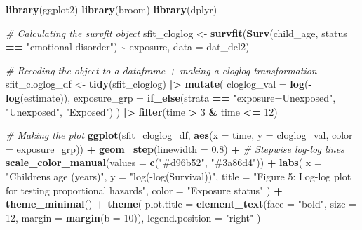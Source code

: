 \documentclass[
]{article}
\newenvironment{Shaded}{\begin{snugshade}}{\end{snugshade}}
\newcommand{\AttributeTok}[1]{\textcolor[rgb]{0.13,0.29,0.53}{#1}}
\newcommand{\CommentTok}[1]{\textcolor[rgb]{0.56,0.35,0.01}{\textit{#1}}}
\newcommand{\DecValTok}[1]{\textcolor[rgb]{0.00,0.00,0.81}{#1}}
\newcommand{\FloatTok}[1]{\textcolor[rgb]{0.00,0.00,0.81}{#1}}
\newcommand{\FunctionTok}[1]{\textcolor[rgb]{0.13,0.29,0.53}{\textbf{#1}}}
\newcommand{\NormalTok}[1]{#1}
\newcommand{\OtherTok}[1]{\textcolor[rgb]{0.56,0.35,0.01}{#1}}
\newcommand{\SpecialCharTok}[1]{\textcolor[rgb]{0.81,0.36,0.00}{\textbf{#1}}}
\newcommand{\StringTok}[1]{\textcolor[rgb]{0.31,0.60,0.02}{#1}}
\begin{document}
\begin{Shaded}
\begin{Highlighting}[]
\FunctionTok{library}\NormalTok{(ggplot2)}
\FunctionTok{library}\NormalTok{(broom)}
\FunctionTok{library}\NormalTok{(dplyr)}

\CommentTok{\# Calculating the survfit object}
\NormalTok{sfit\_cloglog }\OtherTok{\textless{}{-}} \FunctionTok{survfit}\NormalTok{(}\FunctionTok{Surv}\NormalTok{(child\_age, status }\SpecialCharTok{==} \StringTok{"emotional disorder"}\NormalTok{) }\SpecialCharTok{\textasciitilde{}}\NormalTok{ exposure,}
                        \AttributeTok{data =}\NormalTok{ dat\_del2)}

\CommentTok{\# Recoding the object to a dataframe + making a cloglog{-}transformation }
\NormalTok{sfit\_cloglog\_df }\OtherTok{\textless{}{-}} \FunctionTok{tidy}\NormalTok{(sfit\_cloglog) }\SpecialCharTok{|\textgreater{}} 
  \FunctionTok{mutate}\NormalTok{(}
    \AttributeTok{cloglog\_val =} \FunctionTok{log}\NormalTok{(}\SpecialCharTok{{-}}\FunctionTok{log}\NormalTok{(estimate)),}
    \AttributeTok{exposure\_grp =} \FunctionTok{if\_else}\NormalTok{(strata }\SpecialCharTok{==} \StringTok{"exposure=Unexposed"}\NormalTok{, }\StringTok{"Unexposed"}\NormalTok{, }\StringTok{"Exposed"}\NormalTok{)}
\NormalTok{  ) }\SpecialCharTok{|\textgreater{}} 
  \FunctionTok{filter}\NormalTok{(time }\SpecialCharTok{\textgreater{}} \DecValTok{3} \SpecialCharTok{\&}\NormalTok{ time }\SpecialCharTok{\textless{}=} \DecValTok{12}\NormalTok{)  }

\CommentTok{\# Making the plot }
\FunctionTok{ggplot}\NormalTok{(sfit\_cloglog\_df, }
       \FunctionTok{aes}\NormalTok{(}\AttributeTok{x =}\NormalTok{ time, }\AttributeTok{y =}\NormalTok{ cloglog\_val, }\AttributeTok{color =}\NormalTok{ exposure\_grp)) }\SpecialCharTok{+}
  \FunctionTok{geom\_step}\NormalTok{(}\AttributeTok{linewidth =} \FloatTok{0.8}\NormalTok{) }\SpecialCharTok{+}                           \CommentTok{\# Stepwise log{-}log lines}
  \FunctionTok{scale\_color\_manual}\NormalTok{(}\AttributeTok{values =} \FunctionTok{c}\NormalTok{(}\StringTok{"\#d96b52"}\NormalTok{, }\StringTok{"\#3a86d4"}\NormalTok{)) }\SpecialCharTok{+}
  \FunctionTok{labs}\NormalTok{(}
    \AttributeTok{x =} \StringTok{"Children\textquotesingle{}s age (years)"}\NormalTok{,}
    \AttributeTok{y =} \StringTok{"log({-}log(Survival))"}\NormalTok{,}
    \AttributeTok{title =} \StringTok{"Figure 5: Log{-}log plot for testing proportional hazards"}\NormalTok{,}
    \AttributeTok{color =} \StringTok{"Exposure status"}
\NormalTok{  ) }\SpecialCharTok{+}
  \FunctionTok{theme\_minimal}\NormalTok{() }\SpecialCharTok{+}
  \FunctionTok{theme}\NormalTok{(}
    \AttributeTok{plot.title =} \FunctionTok{element\_text}\NormalTok{(}\AttributeTok{face =} \StringTok{"bold"}\NormalTok{, }\AttributeTok{size =} \DecValTok{12}\NormalTok{, }\AttributeTok{margin =} \FunctionTok{margin}\NormalTok{(}\AttributeTok{b =} \DecValTok{10}\NormalTok{)),}
    \AttributeTok{legend.position =} \StringTok{"right"}
\NormalTok{  )}
\end{Highlighting}
\end{Shaded}
\end{document}
